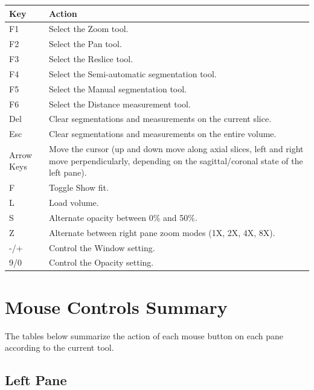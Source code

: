 \documentclass[12pt]{report}
\begin{document}
\begin{center}
\begin{tabular}{|l|p{12cm}|}
\hline
Key & Action \\
\hline
F1 & Select the Zoom tool. \\
F2 & Select the Pan tool. \\
F3 & Select the Reslice tool. \\
F4 & Select the Semi-automatic segmentation tool. \\
F5 & Select the Manual segmentation tool. \\
F6 & Select the Distance measurement tool. \\
Del & Clear segmentations and measurements on the current slice. \\
Esc & Clear segmentations and measurements on the entire volume. \\
Arrow Keys & Move the cursor (up and down move along axial slices, left and right
move perpendicularly, depending on the sagittal/coronal state of the left pane). \\
F   & Toggle Show fit. \\
L   & Load volume. \\
S   & Alternate opacity between 0\% and 50\%. \\
Z   & Alternate between right pane zoom modes (1X, 2X, 4X, 8X). \\
-/+ & Control the Window setting. \\
9/0 & Control the Opacity setting. \\
\hline

\end{tabular}
\end{center}

\newpage
\section{Mouse Controls Summary}

The tables below summarize the action of each mouse button on each pane
according to the current tool. 

\subsection{Left Pane}
\end{document}
